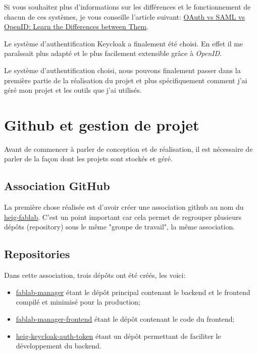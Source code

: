 \documentclass[
    iai, %
    il, %
]{heig-tb}
\begin{document}
Si vous souhaitez plus d'informations sur les différences et le fonctionnement de chacun de ces systèmes, je vous conseille l'article suivant: \href{https://www.parallels.com/blogs/ras/oauth-vs-saml-vs-openid/#:~:text=While%20the%20use%20cases%20for,than%20SAML%20and%20OpenID%20Connect}{OAuth vs SAML vs OpenID: Learn the Differences between Them}.


Le système d'authentification Keycloak a finalement été choisi. En effet il me paraîssait plus adapté et le plus facilement extensible grâce à \emph{OpenID}.

Le système d'authentification choisi, nous pouvons finalement passer dans la première partie de la réalisation du projet et plus spécifiquement comment j'ai géré mon projet et les outils que j'ai utilisés.

\chapter{Github et gestion de projet}
Avant de commencer à parler de conception et de réalisation, il est nécessaire de parler de la façon dont les projets sont stockés et géré.

\section{Association GitHub}
La première chose réalisée est d'avoir créer une association \Gls{github} au nom du \href{https://github.com/heig-fablab}{heig-fablab}. C'est un point important car cela permet de regrouper plusieurs dépôts (\Gls{repository}) sous le même "groupe de travail", la même association.

\section{Repositories}
Dans cette association, trois dépôts ont été créés, les voici:
\begin{itemize}
    \item \href{https://github.com/heig-fablab/fablab-manager}{fablab-manager} étant le dépôt principal contenant le \Gls{backend} et le \Gls{frontend} compilé et minimisé pour la production;
    \item \href{https://github.com/heig-fablab/fablab-manager-frontend}{fablab-manager-frontend} étant le dépôt contenant le code du {frontend};
    \item \href{https://github.com/heig-fablab/heig-keycloak-auth-token}{heig-keycloak-auth-token} étant un dépôt permettant de faciliter le développement du \Gls{backend}.
\end{itemize}
\end{document}

